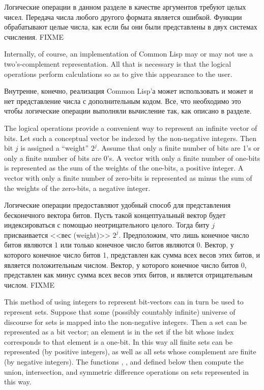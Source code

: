 Логические операции в данном разделе в качестве аргументов требуют целых
чисел. Передача числа любого другого формата является ошибкой.
Функции обрабатывают целые числа, как если бы они были представлены в двух
системах счисления. FIXME

\beforenoterule
\begin{implementation}
Internally, of course, an implementation of
Common Lisp may or may not use a two's-complement representation.
All that is necessary is that the logical operations
perform calculations so as to give this appearance to the user.

Внутренне, конечно, реализация Common Lisp'а может использовать и может и нет
представление числа с дополнительным кодом. Все, что необходимо это чтобы
логические операции выполняли вычисление так, как описано в разделе.
\end{implementation}
\afternoterule

The logical operations provide a convenient way to represent
an infinite vector of bits.  Let such a conceptual vector be
indexed by the non-negative integers.  Then bit $j$ is assigned
a ``weight'' $2^{j}$.
Assume that only a finite number of bits are 1's
or only a finite number of bits are 0's.
A vector with only a finite number of one-bits is represented
as the sum of the weights of the one-bits, a positive integer.
A vector with only a finite number of zero-bits is represented
as  minus the sum of the weights of the zero-bits, a negative integer.

Логические операции предоставляют удобный способ для представления бесконечного
вектора битов. Пусть такой концептуальный вектор будет индексироваться с помощью
неотрицательного целого. Тогда биту $j$ присваивается <<вес (weight)>> $2^{j}$.
Предположим, что лишь конечное число битов являются 1 или только конечное
число битов являются 0.
Вектор, у которого конечное число битов 1, представлен как сумма всех весов этих
битов, и является положительным числом.
Вектор, у которого конечное число битов 0, представлен как  минус сумма
всех весов этих битов, и является отрицательным числом. FIXME

This method of using integers to represent bit-vectors can in turn
be used to represent sets. Suppose that some (possibly countably
infinite) universe of discourse
for sets is mapped into the non-negative integers.
Then a set can be represented as a bit vector; an element is in the
set if the bit whose index corresponds to that element is a one-bit.
In this way all finite sets can be represented (by positive
integers), as well as all sets whose complement are finite
(by negative integers).  The functions , ,
and  defined below then compute the union,
intersection, and symmetric difference operations on sets
represented in this way.

